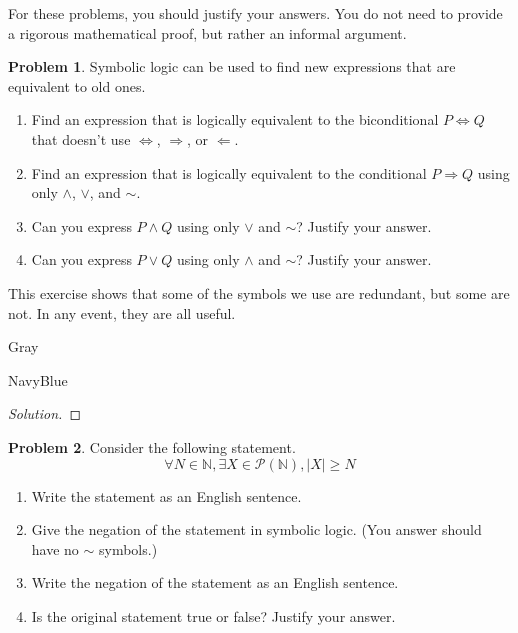 \documentclass[12pt]{amsart}
\newcounter{problem_number}[section]
\theoremstyle{named}
\newenvironment{soln}
{\begin{color}{Gray}\begin{framed}\begin{color}{NavyBlue}\begin{proof}[Solution]
\doublespacing}
{\end{proof}\end{color}\end{framed}\end{color}}
\theoremstyle{definition}
\newtheorem{problem}{Problem}
\newcommand{\N}{\mathbb N}
\begin{document}
For these problems, you should justify your answers. You do not need to provide a rigorous mathematical proof, but rather an informal argument.

\vspace{5mm}

\begin{problem}
	Symbolic logic can be used to find new expressions that are equivalent to old ones.
	\begin{enumerate}
		\item Find an expression that is logically equivalent to the biconditional $P\Leftrightarrow Q$ that doesn't use $\Leftrightarrow$, $\Rightarrow$, or $\Leftarrow$.
		\item Find an expression that is logically equivalent to the conditional $P\Rightarrow Q$ using only $\wedge$, $\vee$, and $\sim$.
		\item Can you express $P\wedge Q$ using only $\vee$ and $\sim$? Justify your answer.
		\item Can you express $P\vee Q$ using only $\wedge$ and $\sim$? Justify your answer.
	\end{enumerate}
	This exercise shows that some of the symbols we use are redundant, but some are not. In any event, they are all useful.
\end{problem}

\begin{soln}
	
\end{soln}
\begin{problem}
	Consider the following statement.
$$\forall N\in\N,\exists X\in\mathscr P(\N),|X|\geq N$$

	\begin{enumerate}
		\item Write the statement as an English sentence.
		\item Give the negation of the statement in symbolic logic. (You answer should have no $\sim$ symbols.)
		\item Write the negation of the statement as an English sentence.
		\item Is the original statement true or false? Justify your answer.
	\end{enumerate}
\end{problem}
\end{document}
